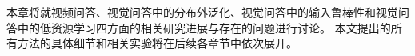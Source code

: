 

本章将就视频问答、视觉问答中的分布外泛化、视觉问答中的输入鲁棒性和视觉问答中的低资源学习四方面的相关研究进展与存在的问题进行讨论。
本文提出的所有方法的具体细节和相关实验将在后续各章节中依次展开。








